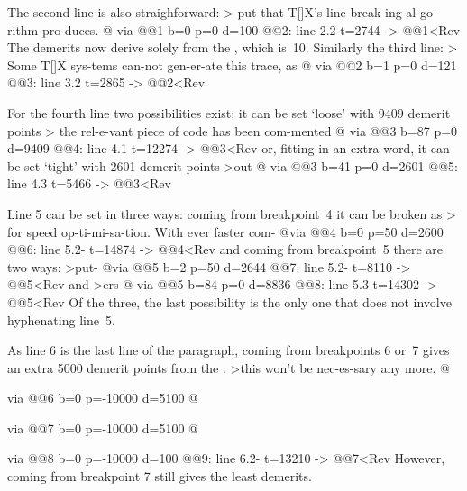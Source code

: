 The second line is also straighforward:
\Ver>
put that T[]X's line break-ing al-go-rithm pro-duces. 
@ via @@1 b=0 p=0 d=100
@@2: line 2.2 t=2744 -> @@1<Rev
The demerits now derive solely from the ,
which is~10. Similarly the third line:
\Ver>
Some T[]X sys-tems can-not gen-er-ate this trace, as 
@ via @@2 b=1 p=0 d=121
@@3: line 3.2 t=2865 -> @@2<Rev

For the fourth line two possibilities exist:
it can be set `loose' with 9409 demerit points
\Ver>
the rel-e-vant piece of code has been com-mented 
@ via @@3 b=87 p=0 d=9409
@@4: line 4.1 t=12274 -> @@3<Rev
or, fitting in an extra word, it can be set `tight' with
2601 demerit points
\Ver>out 
@ via @@3 b=41 p=0 d=2601
@@5: line 4.3 t=5466 -> @@3<Rev

Line 5 can be set in three ways:
coming from breakpoint~4 it can be broken as
\Ver>
for speed op-ti-mi-sa-tion. With ever faster com-
@\discretionary via @@4 b=0 p=50 d=2600
@@6: line 5.2- t=14874 -> @@4<Rev
and coming from breakpoint~5 there are two ways:
\Ver>put-
@\discretionary via @@5 b=2 p=50 d=2644
@@7: line 5.2- t=8110 -> @@5<Rev
and \Ver>ers 
@ via @@5 b=84 p=0 d=8836
@@8: line 5.3 t=14302 -> @@5<Rev
Of the three, the last possibility is the only one that
does not involve hyphenating line~5.

As line 6 is the last line of the paragraph, coming from
breakpoints 6 or~7 gives an extra 5000 demerit points
from the .
\Ver>this won't be nec-es-sary any more. 
@\par via @@6 b=0 p=-10000 d=5100
@\par via @@7 b=0 p=-10000 d=5100
@\par via @@8 b=0 p=-10000 d=100
@@9: line 6.2- t=13210 -> @@7<Rev
However, coming from breakpoint 7 still gives the least
demerits.









